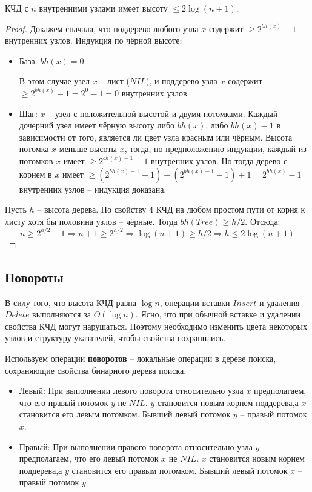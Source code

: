 \documentclass[a4paper,12pt]{article}
\begin{document}
\begin{fulllemma}
КЧД с $n$ внутренними узлами имеет высоту $\leqslant 2\log (n + 1)$.
\end{fulllemma}
\begin{proof}
    Докажем сначала, что поддерево любого узла $x$ содержит $\geqslant 2^{bh(x)} - 1$ внутренних узлов. Индукция по чёрной высоте:
    
    \begin{itemize}
        \item База: $bh(x) = 0$.
        
        В этом случае узел $x$ -- лист ($NIL$), и поддерево узла $x$ содержит $\geqslant 2^{bh(x)} - 1 = 2^0 - 1 = 0$ внутренних узлов.
        
        \item Шаг: $x$ -- узел с положительной высотой и двумя потомками. Каждый дочерний узел имеет чёрную высоту либо $bh(x)$, либо $bh(x) - 1$ в зависимости от того, является ли цвет узла красным или чёрным. Высота потомка $x$ меньше высоты $x$, тогда, по предположению индукции, каждый из потомков $x$ имеет $\geqslant 2^{bh(x) - 1} - 1$ внутренних узлов. Но тогда дерево с корнем в $x$ имеет $\geqslant (2^{bh(x) - 1} - 1) + (2^{bh(x) - 1} - 1) + 1 = 2^{bh(x)} - 1$ внутренних узлов -- индукция доказана. 
    \end{itemize}
    
    Пусть $h$ -- высота дерева. По свойству 4 КЧД на любом простом пути от корня к листу хотя бы половина узлов -- чёрные. Тогда $bh(Tree) \geqslant h\slash2$. Отсюда: \[n \geqslant 2^{h\slash2} - 1 \Rightarrow n + 1 \geqslant 2^{h\slash2} \Rightarrow \log (n + 1) \geqslant h\slash2 \Rightarrow h \leqslant 2 \log (n + 1)\]
\end{proof}

\subsection{Повороты}

В силу того, что высота КЧД равна $\log n$, операции вставки $Insert$ и удаления $Delete$ выполняются за $O(\log n)$. Ясно, что при обычной вставке и удалении свойства КЧД могут нарушаться. Поэтому необходимо изменить цвета некоторых узлов и структуру указателей, чтобы свойства сохранились.

Используем операции \textbf{поворотов} -- локальные операции в дереве поиска, сохраняющие свойства бинарного дерева поиска.

\begin{itemize}
    \item Левый: При выполнении левого поворота относительно узла $x$ предполагаем, что его правый потомок $y$ не $NIL$. $y$ становится новым корнем поддерева,а $x$ становится его левым потомком. Бывший левый потомок $y$ -- правый потомок $x$.
    \item Правый: При выполнении правого поворота относительно узла $y$ предполагаем, что его левый потомок $x$ не $NIL$. $x$ становится новым корнем поддерева,а $y$ становится его правым потомком. Бывший левый потомок $x$ -- правый потомок $y$.
\end{itemize}
\end{document}
